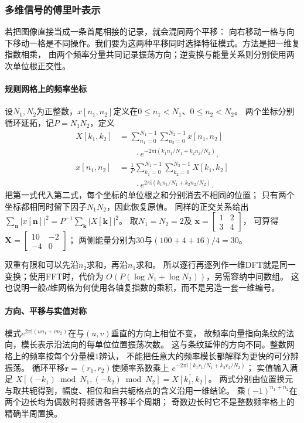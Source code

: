 \subsubsection{多维信号的傅里叶表示}
\label{sec:signal-multidimensional-fourier}

若把图像直接当成一条首尾相接的记录，就会混同两个平移：
向右移动一格与向下移动一格是不同操作。我们要为这两种平移同时选择特征模式。方法是把一维复指数相乘，
由两个频率分量共同记录振荡方向；逆变换与能量关系则分别使用两次单位根正交性。

\paragraph{规则网格上的频率坐标}
设$N_1,N_2$为正整数，$x[n_1,n_2]$定义在$0\leq n_1<N_1$、$0\leq n_2<N_2$。
两个坐标分别循环延拓，记$P=N_1N_2$，定义
\begin{equation}
 \begin{aligned}
 X[k_1,k_2]
 &=\sum_{n_1=0}^{N_1-1}\sum_{n_2=0}^{N_2-1}
 x[n_1,n_2]\\
 &\qquad\cdot e^{-2\pi\mathrm i(k_1n_1/N_1+k_2n_2/N_2)},\\
 x[n_1,n_2]
 &=\frac1P\sum_{k_1=0}^{N_1-1}\sum_{k_2=0}^{N_2-1}
 X[k_1,k_2]\\
 &\qquad\cdot e^{2\pi\mathrm i(k_1n_1/N_1+k_2n_2/N_2)}.
 \end{aligned}
 \label{eq:signal-multidimensional-dft}
\end{equation}
把第一式代入第二式，每个坐标的单位根之和分别消去不相同的位置；
只有两个坐标都相同时留下因子$N_1N_2$，因此恢复原值。
同样的正交关系给出
$\sum_{\bm n}|x[\bm n]|^2=P^{-1}\sum_{\bm k}|X[\bm k]|^2$。
取$N_1=N_2=2$及
$\bm x=\begin{bmatrix}1&2\\3&4\end{bmatrix}$，
可算得$\bm X=\begin{bmatrix}10&-2\\-4&0\end{bmatrix}$；
两侧能量分别为$30$与$(100+4+16)/4=30$。

双重有限和可以先沿$n_2$求和，再沿$n_1$求和。
所以逐行再逐列作一维DFT就是同一变换；使用FFT时，代价为
$O(P(\log N_1+\log N_2))$，另需容纳中间数组。
这也说明一般$d$维网格为何使用各轴复指数的乘积，而不是另造一套一维编号。

\paragraph{方向、平移与实值对称}
模式$e^{2\pi\mathrm i(un_1+vn_2)}$在与$(u,v)$垂直的方向上相位不变，
故频率向量指向条纹的法向，模长表示沿法向的每单位位置振荡次数。
这与条纹延伸的方向不同。整数网格上的频率按每个分量模$1$辨认，
不能把任意大的频率模长都解释为更快的可分辨振荡。
循环平移$\bm r=(r_1,r_2)$使频率系数乘上
$e^{-2\pi\mathrm i(k_1r_1/N_1+k_2r_2/N_2)}$；
实值输入满足
$X[(-k_1)\bmod N_1,(-k_2)\bmod N_2]=\overline{X[k_1,k_2]}$。
两式分别由位置换元与取共轭得到，幅度、相位和自共轭格点的含义沿用一维结论。
乘$(-1)^{n_1+n_2}$在两个边长均为偶数时将频谱各平移半个周期；
奇数边长时它不是整数频率格上的精确半周置换。

